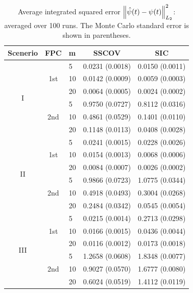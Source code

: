 \begin{table}[ht]
\caption{Average integrated squared error $\left\|\hat{\psi}(t) - \psi(t)\right\|^2_{L_2}$: averaged over 100 runs. The Monte Carlo standard error is shown in parentheses.}
\centering
\begin{tabular}{|c|c|l|cc|}
  \hline
Scenerio & FPC & m & SSCOV & SIC \\ 
  \hline
\multirow{6}{*}{I}&  \multirow{3}{*}{1st} &  5  & 0.0231 (0.0018) & 0.0150 (0.0011) \\ 
			 &				    & 10 & 0.0142 (0.0009) & 0.0059 (0.0003) \\ 
			 &				    & 20 & 0.0064 (0.0005) & 0.0024 (0.0002) \\ 
   		\cline{2-5}
			 & \multirow{3}{*}{2nd} & 5   & 0.9750 (0.0727) & 0.8112  (0.0316) \\ 
 			 & 				    & 10 & 0.4861 (0.0529) & 0.1401  (0.0110) \\ 
  			 &       			    & 20 & 0.1148 (0.0113) & 0.0408  (0.0028) \\ 
\hline
\multirow{6}{*}{II}&   \multirow{3}{*}{1st} & 5  & 0.0241  (0.0015) & 0.0228  (0.0026) \\ 
			  &  				      & 10 & 0.0154 (0.0013) & 0.0068  (0.0006) \\ 
			  &        			      & 20 & 0.0084 (0.0007) & 0.0026  (0.0002) \\ 
   		\cline{2-5}
			  & \multirow{3}{*}{2nd} & 5   & 0.9866  (0.0723) & 1.0775  (0.0344) \\ 
			  &  				     & 10 & 0.4918  (0.0493) & 0.3004  (0.0268) \\ 
			  &        			     & 20 & 0.2484  (0.0342) & 0.0545  (0.0054) \\ 
\hline
\multirow{6}{*}{III} &   \multirow{3}{*}{1st} & 5   & 0.0215  (0.0014) & 0.2713  (0.0298) \\ 
 			     &				        & 10 & 0.0166  (0.0015) & 0.0436  (0.0044) \\ 
 			    &       				& 20 & 0.0116  (0.0012) & 0.0173  (0.0018) \\ 
    		\cline{2-5}
   			    & \multirow{3}{*}{2nd} & 5   & 1.2658  (0.0608) & 1.8348  (0.0077) \\ 
			    & 				       & 10 & 0.9027  (0.0570) & 1.6777  (0.0080) \\ 
  			    &       			       & 20 & 0.6024  (0.0519) & 1.4112  (0.0119) \\ 
   \hline
\end{tabular}
\label{tab:fpc-norm}
\end{table}

